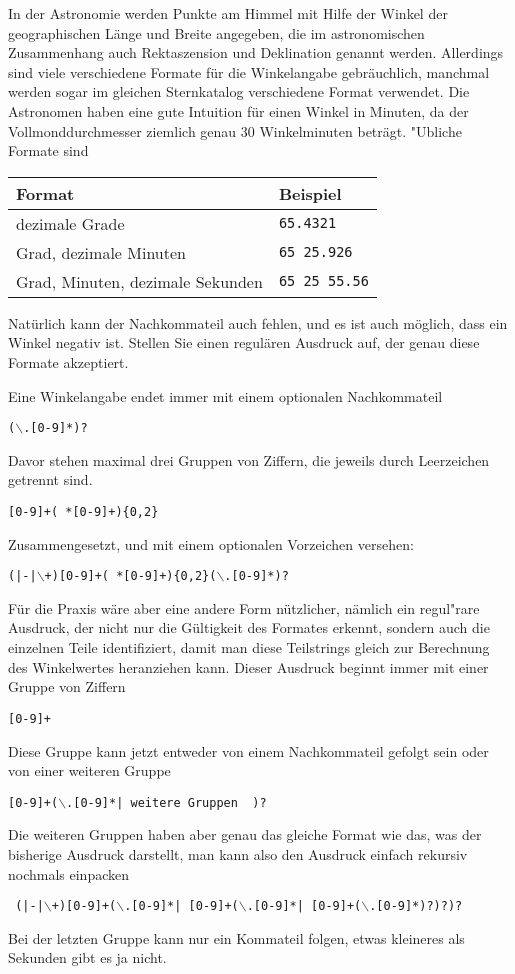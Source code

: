 In der Astronomie werden Punkte am Himmel mit Hilfe der Winkel
der geographischen Länge und Breite angegeben, die im astronomischen
Zusammenhang auch
Rektaszension und Deklination genannt werden.
Allerdings sind viele verschiedene Formate für die
Winkelangabe gebräuchlich, manchmal werden sogar im gleichen Sternkatalog
verschiedene Format verwendet.
Die Astronomen haben eine gute Intuition für einen Winkel in Minuten,
da der Vollmonddurchmesser ziemlich genau 30 Winkelminuten beträgt.
"Ubliche Formate sind
\begin{center}
\begin{tabular}{ll}
Format&Beispiel\\
\hline
dezimale Grade&\texttt{65.4321}\\
Grad, dezimale Minuten&\texttt{65 25.926}\\
Grad, Minuten, dezimale Sekunden&\texttt{65 25 55.56}\\
\hline
\end{tabular}
\end{center}
Natürlich kann der Nachkommateil auch fehlen, und es ist auch möglich, dass
ein Winkel negativ ist.
Stellen Sie einen regulären Ausdruck auf, der genau diese Formate
akzeptiert. 

\begin{loesung}
Eine Winkelangabe endet immer mit einem optionalen Nachkommateil
\begin{center}
\tt($\backslash$.[0-9]*)?
\end{center}
Davor stehen maximal drei Gruppen von Ziffern, die jeweils durch
Leerzeichen getrennt sind.
\begin{center}
\tt[0-9]+( *[0-9]+)\{0,2\}
\end{center}
Zusammengesetzt, und mit einem optionalen Vorzeichen versehen:
\begin{center}
\tt (|-|$\backslash$+)[0-9]+( *[0-9]+)\{0,2\}($\backslash$.[0-9]*)?
\end{center}

Für die Praxis wäre aber eine andere Form nützlicher, nämlich ein
regul"rare Ausdruck, der nicht nur die Gültigkeit des Formates
erkennt, sondern auch die einzelnen Teile identifiziert, damit man
diese Teilstrings gleich zur Berechnung des Winkelwertes heranziehen
kann. Dieser Ausdruck beginnt immer mit einer Gruppe von Ziffern
\begin{center}
\tt [0-9]+
\end{center}
Diese Gruppe kann jetzt entweder von einem Nachkommateil gefolgt sein
oder von einer weiteren Gruppe
\begin{center}
\tt [0-9]+($\backslash$.[0-9]*| {\rm weitere Gruppen } )?
\end{center}
Die weiteren Gruppen haben aber genau das gleiche Format wie das,
was der bisherige Ausdruck darstellt, man kann also den Ausdruck einfach
rekursiv nochmals einpacken
\begin{center}
\tt
(|-|$\backslash$+)[0-9]+($\backslash$.[0-9]*| [0-9]+($\backslash$.[0-9]*| [0-9]+($\backslash$.[0-9]*)?)?)?
\end{center}
Bei der letzten Gruppe kann nur ein Kommateil folgen, etwas kleineres
als Sekunden gibt es ja nicht.
\end{loesung}

